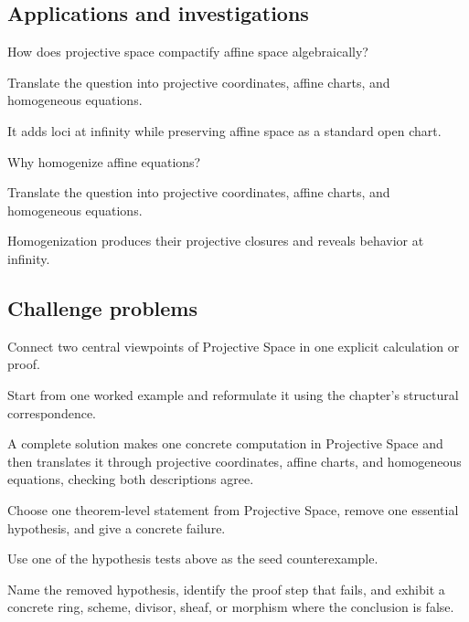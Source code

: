 \subsection*{Applications and investigations}

\begin{exercise}[Compactification]\label{exr:vi36-expand-13}
How does projective space compactify affine space algebraically?
\end{exercise}
\begin{hint}
Translate the question into projective coordinates, affine charts, and homogeneous equations.
\end{hint}
\begin{solution}
It adds loci at infinity while preserving affine space as a standard open chart.
\end{solution}

\begin{exercise}[Homogenization]\label{exr:vi36-expand-14}
Why homogenize affine equations?
\end{exercise}
\begin{hint}
Translate the question into projective coordinates, affine charts, and homogeneous equations.
\end{hint}
\begin{solution}
Homogenization produces their projective closures and reveals behavior at infinity.
\end{solution}

\subsection*{Challenge problems}

\begin{exercise}\label{exr:vi36-expand-15}
Connect two central viewpoints of Projective Space in one explicit calculation or proof.
\end{exercise}
\begin{hint}
Start from one worked example and reformulate it using the chapter's structural correspondence.
\end{hint}
\begin{solution}
A complete solution makes one concrete computation in Projective Space and then translates it through projective coordinates, affine charts, and homogeneous equations, checking both descriptions agree.
\end{solution}

\begin{exercise}\label{exr:vi36-expand-16}
Choose one theorem-level statement from Projective Space, remove one essential hypothesis, and give a concrete failure.
\end{exercise}
\begin{hint}
Use one of the hypothesis tests above as the seed counterexample.
\end{hint}
\begin{solution}
Name the removed hypothesis, identify the proof step that fails, and exhibit a concrete ring, scheme, divisor, sheaf, or morphism where the conclusion is false.
\end{solution}

